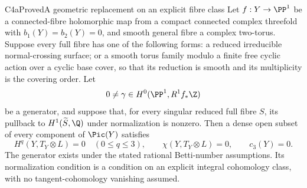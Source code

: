 \begin{statement}{C4a}{Proved}{A geometric replacement on an explicit fibre class}
Let $f:Y\to\PP^1$ be a connected-fibre holomorphic map from a compact connected complex threefold with $b_1(Y)=b_2(Y)=0$, and smooth general fibre a complex two-torus. Suppose every full fibre has one of the following forms: a reduced irreducible normal-crossing surface; or a smooth torus family modulo a finite free cyclic action over a cyclic base cover, so that its reduction is smooth and its multiplicity is the covering order. Let
\[
 0\ne\gamma\in H^0(\PP^1,R^1f_*\Z)
\]
be a generator, and suppose that, for every singular reduced full fibre $S$, its pullback to $H^1(\widetilde S,\Q)$ under normalization is nonzero. Then a dense open subset of every component of $\Pic(Y)$ satisfies
\[
 H^q(Y,T_Y\otimes L)=0\quad(0\le q\le3),\qquad
 \chi(Y,T_Y\otimes L)=0,\qquad c_3(Y)=0.                \tag{C.15}
\]
The generator exists under the stated rational Betti-number assumptions. Its normalization condition is a condition on an explicit integral cohomology class, with no tangent-cohomology vanishing assumed.
\end{statement}
